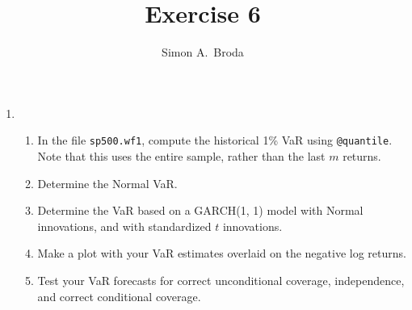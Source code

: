 \documentclass[11pt, a4paper]{article}
\begin{document}
\title{Exercise 6}
\author{Simon A.\ Broda}
\date{}
\maketitle

\begin{enumerate}

\item 
\begin{enumerate}
\item In the file \texttt{sp500.wf1}, compute the historical 1\% VaR using \verb.@quantile.. Note that this uses the entire sample, rather than the last $m$ returns.
\item Determine the Normal VaR.
\item Determine the VaR based on a GARCH(1, 1) model with Normal innovations, and with standardized $t$ innovations.
\item Make a plot with your VaR estimates overlaid on the negative log returns.
\item Test your VaR forecasts for correct unconditional coverage, independence, and correct conditional coverage.
\end{enumerate}
\end{enumerate}
\end{document}
